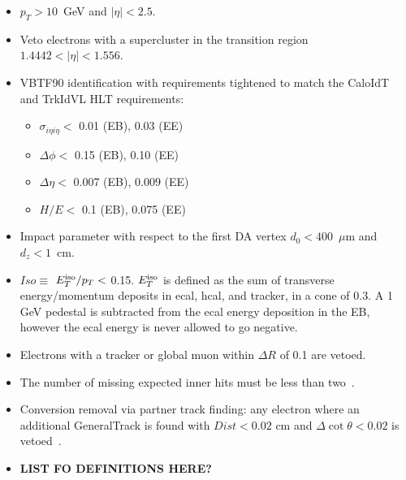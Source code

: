\begin{itemize}

\item $p_{T}>10$~GeV and $|\eta| < 2.5$.

\item Veto electrons with a supercluster in the transition region $1.4442 < |\eta| < 1.556$.

\item VBTF90 identification\cite{ref:vbtf} with requirements tightened to match the CaloIdT and TrkIdVL HLT requirements:

  \begin{itemize}
  \item $\sigma_{i\eta i\eta} < $ 0.01 (EB), 0.03 (EE)
  \item $\Delta\phi < $ 0.15 (EB), 0.10 (EE)
  \item $\Delta\eta < $ 0.007 (EB), 0.009 (EE)
  \item $H/E < $ 0.1 (EB), 0.075 (EE)
  \end{itemize}  

\item Impact parameter with respect to the first DA vertex $d_0 < 400$~$\mu$m and $d_z < 1$~cm.

\item $Iso \equiv $ $E_T^{\rm iso}/p_T < $ 0.15.  $E_T^{\rm iso}$
is defined as the sum of transverse energy/momentum deposits in ecal,
hcal, and tracker, in a 
cone of 0.3.  A 1 GeV pedestal is subtracted from the ecal energy 
deposition in the EB, however the ecal energy is never allowed to 
go negative.

\item Electrons with a tracker or global muon within $\Delta R$ of 
0.1 are vetoed.

\item The number of missing expected inner hits must be less than 
two~\cite{ref:conv}.

\item Conversion removal via partner track finding: any electron
where an additional GeneralTrack is found with $Dist < 0.02$ cm 
and $\Delta \cot \theta < 0.02$ is vetoed~\cite{ref:conv}.


\item {\color{red} \bf LIST FO DEFINITIONS HERE? }

\end{itemize}

